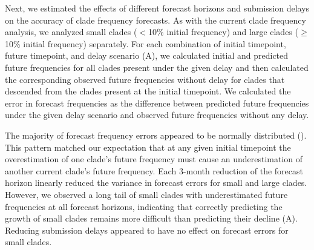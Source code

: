 \documentclass[9pt,lineno]{elife}
\begin{document}
Next, we estimated the effects of different forecast horizons and submission delays on the accuracy of clade frequency forecasts.
As with the current clade frequency analysis, we analyzed small clades ($<$10\% initial frequency) and large clades ($\ge$10\% initial frequency) separately.
For each combination of initial timepoint, future timepoint, and delay scenario (A), we calculated initial and predicted future frequencies for all clades present under the given delay and then calculated the corresponding observed future frequencies without delay for clades that descended from the clades present at the initial timepoint.
We calculated the error in forecast frequencies as the difference between predicted future frequencies under the given delay scenario and observed future frequencies without any delay.

The majority of forecast frequency errors appeared to be normally distributed ().
This pattern matched our expectation that at any given initial timepoint the overestimation of one clade's future frequency must cause an underestimation of another current clade's future frequency.
Each 3-month reduction of the forecast horizon linearly reduced the variance in forecast errors for small and large clades.
However, we observed a long tail of small clades with underestimated future frequencies at all forecast horizons, indicating that correctly predicting the growth of small clades remains more difficult than predicting their decline (A).
Reducing submission delays appeared to have no effect on forecast errors for small clades.
\end{document}

